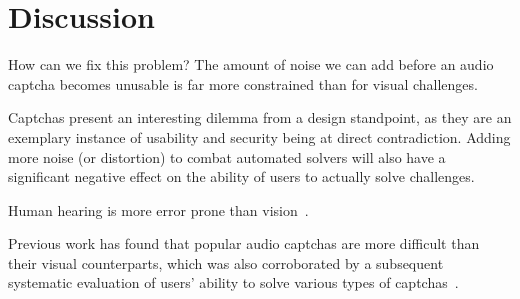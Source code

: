 \section{Discussion}
\label{sec:discussion}

How can we fix this problem? The amount of noise we can add before an audio captcha becomes unusable is 
far more constrained than for visual challenges.

Captchas present an interesting dilemma from a design standpoint, as they are an exemplary instance
of usability and security being at direct contradiction. Adding more noise (or distortion) to combat
automated solvers will also have a significant negative effect on the ability of users to actually
solve challenges.

Human hearing is more error prone than vision~\cite{o2009auditory,shinn2008object}.

Previous work has found that popular audio captchas are more difficult than their visual counterparts,
which was also corroborated by a subsequent systematic evaluation of users' ability to solve various types of
captchas~\cite{captchas-are-hard}.

